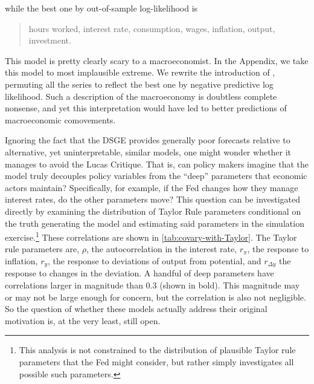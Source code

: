 \documentclass[11pt]{article}
\begin{document}
\noindent while the best one by out-of-sample log-likelihood is

\begin{quotation}
hours worked, interest rate, consumption, wages, inflation, output, investment.
\end{quotation}

\noindent This model is pretty clearly scary to a macroeconomist. In the
Appendix, we take this model to most implausible extreme. We rewrite the
introduction of \citet{SmetsWouters2007}, permuting all the series to
reflect the best one by negative predictive log likelihood. Such a
description of the macroeconomy is doubtless complete nonsense, and yet
this interpretation would have led to better predictions of
macroeconomic comovements.

Ignoring the fact that the DSGE provides generally poor forecasts
relative to alternative, yet uninterpretable, similar models, one might
wonder whether it manages to avoid the Lucas Critique. That is, can
policy makers imagine that the model truly decouples policy variables
from the ``deep'' parameters that economic actors maintain?
Specifically, for example, if the Fed changes how they manage interest
rates, do the other parameters move? This question can be investigated
directly by examining the distribution of Taylor Rule parameters
conditional on the truth generating the model and estimating said
parameters in the simulation exercise.\footnote{This analysis is not
  constrained to the distribution of plausible Taylor rule parameters
  that the Fed might consider, but rather simply investigates all
  possible such parameters.} These correlations are shown in
\autoref{tab:covary-with-Taylor}. The Taylor rule parameters are,
\(\rho\), the autocorrelation in the interest rate, \(r_\pi\), the
response to inflation, \(r_y\), the response to deviations of output
from potential, and \(r_{\Delta y}\) the response to changes in the
deviation. A handful of deep parameters have correlations larger in
magnitude than 0.3 (shown in bold). This magnitude may or may not be
large enough for concern, but the correlation is also not negligible. So
the question of whether these models actually address their original
motivation is, at the very least, still open.
\end{document}
